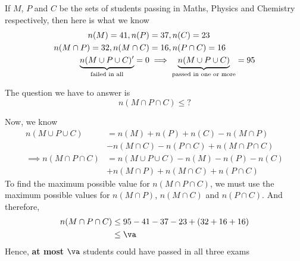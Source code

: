 \begin{solution}
  If $M$, $P$ and $C$ be the sets of students passing in Maths, Physics and 
  Chemistry respectively, then here is what we know 
  \begin{align}
    n(M) = 41, n(P)&=37, n(C)=23 \\
    n(M\cap P) = 32, n(M\cap C) &= 16, n(P\cap C) = 16 \\
    \underbrace{n(M\cup P\cup C)'}_{\text{failed in all}} = 0 &\implies
    \underbrace{n(M\cup P\cup C)}_{\text{passed in one or more}} = 95
  \end{align}

  The question we have to answer is \[ n(M\cap P\cap C)\leq ?\]
  
  Now, we know
  \begin{align}
    n(M\cup P\cup C) &= n(M) + n(P) + n(C) - n(M\cap P) \nonumber \\
                     &- n(M\cap C) - n(P\cap C) + n(M\cap P\cap C) \\
    \implies n(M\cap P\cap C) &= n(M\cup P\cup C) - n(M) - n(P) - n(C) \nonumber \\
                              &+ n(M\cap P) + n(M\cap C) + n(P\cap C)
  \end{align}
  To find the maximum possible value for $n(M\cap P\cap C)$, we must use the maximum possible 
  values for $n(M\cap P)$, $n(M\cap C)$ and $n(P\cap C)$. And therefore, 
  \begin{align}
    n(M\cap P\cap C) &\leq \vt-\vm-\vp-\vc + (\vx + \vy + \vz) \\
                     &\leq \va
  \end{align}
  Hence, \textbf{at most} $\va$ students could have passed in all three exams
\end{solution}

